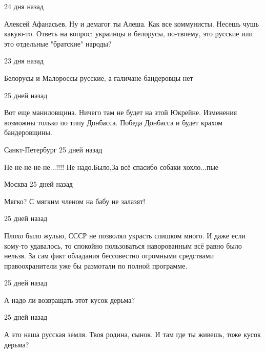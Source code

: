 \begin{itemize}
 24 дня назад

Алексей Афанасьев, Ну и демагог ты Алеша. Как все коммунисты. Несешь чушь
какую-то. Ответь на вопрос: украинцы и белорусы, по-твоему, это русские или это
отдельные "братские" народы?

 23 дня назад

Белорусы и Малороссы русские, а галичане-бандеровцы нет 

 25 дней назад  

Вот еще маниловщина. Ничего там не будет на этой Юкрейне. Изменения возможны
только по типу Донбасса. Победа Донбасса и будет крахом бандеровщины.

 Санкт-Петербург 25 дней назад  

Не-не-не-не-не...!!!! Не надо.Было,За всё спасибо собаки хохло...пые

 Москва 25 дней назад  

Мягко? С мягким членом на бабу не залазят!

 25 дней назад

Плохо было жулью, СССР не позволял украсть слишком много. И даже если кому-то
удавалось, то спокойно пользоваться наворованным всё равно было нельзя. За сам
факт обладания бессовестно огромными средствами правоохранители уже бы
размотали по полной программе.

25 дней назад  

А надо ли возвращать этот кусок дерьма?

 25 дней назад

А это наша русская земля. Твоя родина, сынок. И там где ты живешь, тоже кусок дерьма?


\end{itemize}

